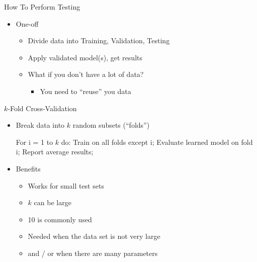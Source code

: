 \documentclass[aspectratio=169]{beamer}
\begin{document}
\begin{frame}[fragile]{How To Perform Testing}

\begin{itemize}
\item One-off
	\begin{itemize}
	\item Divide data into Training, Validation, Testing
	\item Apply validated model(s), get results
	\item What if you don't have a lot of data?
	\begin{itemize}
		\item You need to ``reuse'' you data
	\end{itemize}
	\end{itemize}
	\end{itemize}

\end{frame}
%
%
\begin{frame}[fragile]{$k$-Fold Cross-Validation}

	\begin{itemize}
	\item Break data into $k$ random subsets (``folds'')
\begin{SQL}
For i = 1 to $k$ do:
  Train on all folds except i;
  Evaluate learned model on fold i;
Report average results;
\end{SQL}

\item Benefits
	\begin{itemize}
	\item Works for small test sets
	\item $k$ can be large
	\item 10 is commonly used
	\item Needed when the data set is not very large
	\item and / or when there are many parameters
	\end{itemize}
	\end{itemize}
	

\end{frame}
\end{document}
